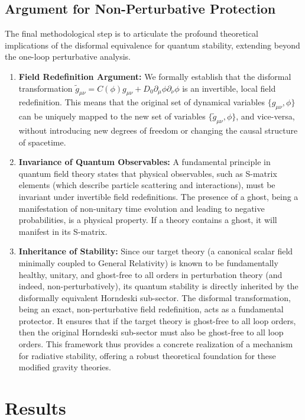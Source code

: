 \documentclass[twocolumn]{aastex631}
\begin{document}
\subsection{Argument for Non-Perturbative Protection}
The final methodological step is to articulate the profound theoretical implications of the disformal equivalence for quantum stability, extending beyond the one-loop perturbative analysis.

\begin{enumerate}
    \item \textbf{Field Redefinition Argument:} We formally establish that the disformal transformation $\tilde{g}_{\mu\nu} = C(\phi) g_{\mu\nu} + D_0 \partial_\mu\phi \partial_\nu\phi$ is an invertible, local field redefinition. This means that the original set of dynamical variables $\{g_{\mu\nu}, \phi\}$ can be uniquely mapped to the new set of variables $\{\tilde{g}_{\mu\nu}, \phi\}$, and vice-versa, without introducing new degrees of freedom or changing the causal structure of spacetime.

    \item \textbf{Invariance of Quantum Observables:} A fundamental principle in quantum field theory states that physical observables, such as S-matrix elements (which describe particle scattering and interactions), must be invariant under invertible field redefinitions. The presence of a ghost, being a manifestation of non-unitary time evolution and leading to negative probabilities, is a physical property. If a theory contains a ghost, it will manifest in its S-matrix.

    \item \textbf{Inheritance of Stability:} Since our target theory (a canonical scalar field minimally coupled to General Relativity) is known to be fundamentally healthy, unitary, and ghost-free to all orders in perturbation theory (and indeed, non-perturbatively), its quantum stability is directly inherited by the disformally equivalent Horndeski sub-sector. The disformal transformation, being an exact, non-perturbative field redefinition, acts as a fundamental protector. It ensures that if the target theory is ghost-free to all loop orders, then the original Horndeski sub-sector must also be ghost-free to all loop orders. This framework thus provides a concrete realization of a mechanism for radiative stability, offering a robust theoretical foundation for these modified gravity theories.
\end{enumerate}

\section{Results}
\label{sec:results}
\label{sec:results}
\end{document}
